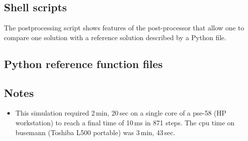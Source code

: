 \subsection{Shell scripts}
\label{odw-sh-files}
\topbar

\bottombar

\noindent
\topbar

\bottombar

\noindent
The postprocessing script shows features of the post-processor that allow
one to compare one solution with a reference solution described by a Python file.

\noindent
\topbar

\bottombar

\subsection{Python reference function files}
\topbar

\bottombar

\noindent
\topbar

\bottombar

\subsection{Notes}
\begin{itemize}
\item This simulation required 2\,min, 20\,sec on a single core of 
  a pse-58 (HP workstation) to reach a final time of 10\,ms in 871 steps.
  The cpu time on busemann (Toshiba L500 portable) was 3\,min, 43\,sec.
\end{itemize}
